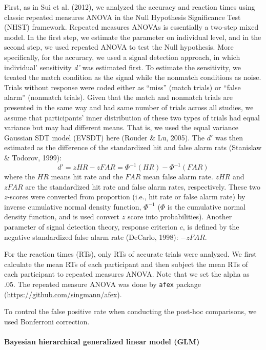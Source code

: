 \documentclass[
  english,
  man]{apa6}
\let\oldparagraph\paragraph
\renewcommand{\paragraph}[1]{\oldparagraph{#1}\mbox{}}
\begin{document}
First, as in Sui et al. (2012), we analyzed the accuracy and reaction times using classic repeated measures ANOVA in the Null Hypothesis Significance Test (NHST) framework. Repeated measures ANOVAs is essentially a two-step mixed model. In the first step, we estimate the parameter on individual level, and in the second step, we used repeated ANOVA to test the Null hypothesis. More specifically, for the accuracy, we used a signal detection approach, in which individual' sensitivity \emph{d'} was estimated first. To estimate the sensitivity, we treated the match condition as the signal while the nonmatch conditions as noise. Trials without response were coded either as \enquote{miss} (match trials) or \enquote{false alarm} (nonmatch trials). Given that the match and nonmatch trials are presented in the same way and had same number of trials across all studies, we assume that participants' inner distribution of these two types of trials had equal variance but may had different means. That is, we used the equal variance Gaussian SDT model (EVSDT) here (Rouder \& Lu, 2005). The \(d'\) was then estimated as the difference of the standardized hit and false alarm rats (Stanislaw \& Todorov, 1999):
\[ d' = zHR - zFAR = \Phi^{-1}(HR) - \Phi^{-1}(FAR) \]
where the \(HR\) means hit rate and the \(FAR\) mean false alarm rate. \(zHR\) and \(zFAR\) are the standardized hit rate and false alarm rates, respectively. These two \(z\)-scores were converted from proportion (i.e., hit rate or false alarm rate) by inverse cumulative normal density function, \(\Phi^{-1}\) (\(\Phi\) is the cumulative normal density function, and is used convert \(z\) score into probabilities). Another parameter of signal detection theory, response criterion \(c\), is defined by the negative standardized false alarm rate (DeCarlo, 1998): \(-zFAR\).

For the reaction times (RTs), only RTs of accurate trials were analyzed. We first calculate the mean RTs of each participant and then subject the mean RTs of each participant to repeated measures ANOVA. Note that we set the alpha as .05. The repeated measure ANOVA was done by \texttt{afex} package (\url{https://github.com/singmann/afex}).

To control the false positive rate when conducting the post-hoc comparisons, we used Bonferroni correction.

\hypertarget{bayesian-hierarchical-generalized-linear-model-glm}{%
\paragraph{Bayesian hierarchical generalized linear model (GLM)}\label{bayesian-hierarchical-generalized-linear-model-glm}}
\end{document}
